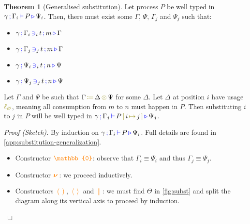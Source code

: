 \documentclass[sigplan,10pt,anonymous,review]{acmart}
\theoremstyle{definition}
\newtheorem{nitheorem}{Theorem}
\newcommand{\type}[1]{\textcolor{blue}{\operatorname{#1}}}
\newcommand{\constr}[1]{\textcolor{orange}{\operatorname{#1}}}
\newcommand{\func}[1]{\textcolor{olive}{\operatorname{#1}}}
\newcommand{\PO}{\constr{\mathbb{0}}}
\newcommand{\comp}[2]{#1 \, \constr{\parallel} \, #2}
\newcommand{\new}{\constr{\boldsymbol{\nu}} \,}
\newcommand{\send}[2]{#1 \, \constr{\langle} \, #2 \,\constr{\rangle} \,}
\newcommand{\recv}[2]{#1 \, \constr{\mathbb{(}} \, #2 \, \constr{\mathbb{)}} \,}
\newcommand{\subst}[3]{#1 \, \func{[} \, #3 \, \func{\mapsto} \,#2 \, \func{]}}
\newcommand{\opctx}[3]{#1 \, \func{\coloneqq} \, #2 \, \func{\otimes} \, #3}
\newcommand{\lz}{\func{\ell_{\varnothing}}}
\newcommand{\types}[4]{#1 \, \type{;} \, #2 \, \type{\vdash} \, #3 \, \type{\triangleright} \, #4}
\newcommand{\contains}[6]{#1 \, \type{;} \, #2 \, \type{\ni}_{#3} \, #4 \, \type{;} \, #5 \, \type{\triangleright} \, #6}
\begin{document}
\begin{nitheorem}[Generalised substitution]
  \label{thm:substitution-generalization}
  Let process $P$ be well typed in $\types{\gamma}{\Gamma_i}{P}{\Psi_i}$.
  Then, there must exist some $\Gamma$, $\Psi$, $\Gamma_j$ and $\Psi_j$ such that:
  \begin{multicols}{2}
  \begin{itemize}
    \item $\contains{\gamma}{\Gamma_i}{i}{t}{m}{\Gamma}$
    \item $\contains{\gamma}{\Gamma_j}{j}{t}{m}{\Gamma}$
    \item $\contains{\gamma}{\Psi_i}{i}{t}{n}{\Psi}$
    \item $\contains{\gamma}{\Psi_j}{j}{t}{n}{\Psi}$
  \end{itemize}
  \end{multicols}
  Let $\Gamma$ and $\Psi$ be such that $\opctx{\Gamma}{\Delta}{\Psi}$ for some $\Delta$.
  Let $\Delta$ at position $i$ have usage $\lz$, meaning all consumption from $m$ to $n$ must happen in $P$.
  Then substituting $i$ to $j$ in $P$ will be well typed in $\types{\gamma}{\Gamma_j}{\subst{P}{j}{i}}{\Psi_j}$.
\end{nitheorem}

\begin{proof}[Proof (Sketch)]
  By induction on $\types{\gamma}{\Gamma_i}{P}{\Psi_i}$.
  Full details are found in \autoref{app:substitution-generalization}.
  \begin{itemize}
   \item
     Constructor $\PO$: observe that $\Gamma_i \equiv \Psi_i$ and thus $\Gamma_j \equiv \Psi_j$.
   \item
     Constructor $\new$: we proceed inductively.
   \item
     Constructors $\recv{}{}$, $\send{}{}$ and $\comp{}{}$: we must find $\Theta$ in \autoref{fig:subst} and split the diagram along its vertical axis to proceed by induction. \qedhere
 \end{itemize}
\end{proof}
\end{document}

